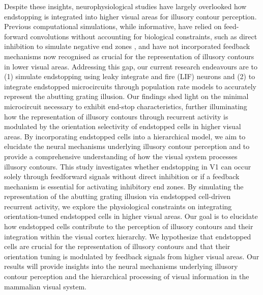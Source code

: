 \documentclass[12pt]{article}
\begin{document}
\bigbreak
Despite these insights, neurophysiological studies have largely overlooked how endstopping is integrated into higher visual areas for illusory contour perception. Previous computational simulations, while informative, have relied on feed-forward convolutions without accounting for biological constraints, such as direct inhibition to simulate negative end zones \autocite{sillitoContributionExcitatoryInhibitory1977}, and have not incorporated feedback mechanisms now recognised as crucial for the representation of illusory contours in lower visual areas. Addressing this gap, our current research endeavours are to (1) simulate endstopping using leaky integrate and fire (LIF) neurons and (2) to integrate endstopped microcircuits through population rate models to accurately represent the abutting grating illusion. Our findings shed light on the minimal microcircuit necessary to exhibit end-stop characteristics, further illuminating how the representation of illusory contours through recurrent activity is modulated by the orientation selectivity of endstopped cells in higher visual areas. By incorporating endstopped cells into a hierarchical model, we aim to elucidate the neural mechanisms underlying illusory contour perception and to provide a comprehensive understanding of how the visual system processes illusory contours.
\bigbreak
This study investigates whether endstopping in V1 can occur solely through feedforward signals without direct inhibition or if a feedback mechanism is essential for activating inhibitory end zones. By simulating the representation of the abutting grating illusion via endstopped cell-driven recurrent activity, we explore the physiological constraints on integrating orientation-tuned endstopped cells in higher visual areas. Our goal is to elucidate how endstopped cells contribute to the perception of illusory contours and their integration within the visual cortex hierarchy. We hypothesize that endstopped cells are crucial for the representation of illusory contours and that their orientation tuning is modulated by feedback signals from higher visual areas. Our results will provide insights into the neural mechanisms underlying illusory contour perception and the hierarchical processing of visual information in the mammalian visual system.

\newpage
\end{document}
